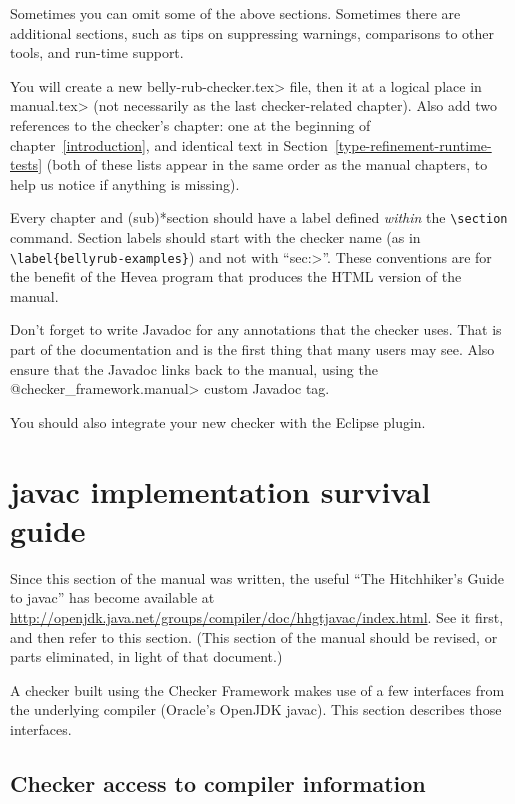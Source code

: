 Sometimes you can omit some of the above sections.  Sometimes there are
additional sections, such as tips on suppressing warnings, comparisons to
other tools, and run-time support.

You will create a new \<belly-rub-checker.tex> file,
then \verb|| it at a logical place in \<manual.tex> (not
necessarily as the last checker-related chapter).  Also add two references
to the checker's chapter:  one at the beginning of
chapter~\ref{introduction}, and identical text in
Section~\ref{type-refinement-runtime-tests} (both of these lists appear in
the same order as the manual chapters, to help us notice if anything is
missing).

Every chapter and (sub)*section should have a label defined \emph{within} the 
\verb|\section| command.  Section labels should start with the checker
name (as in \verb|\label{bellyrub-examples}|) and not with ``\<sec:>''.
These conventions are for the benefit of the Hevea program that produces
the HTML version of the manual.

Don't forget to write Javadoc for any annotations that the checker uses.
That is part of the documentation and is the first thing that many users
may see.  Also ensure that the Javadoc links back to the manual, using the
\<@checker\_framework.manual> custom Javadoc tag.

You should also integrate your new checker with the Eclipse plugin.


\section{javac implementation survival guide\label{javac-tips}}

Since this section of the manual was written, the useful ``The Hitchhiker's
Guide to javac'' has become available at
\url{http://openjdk.java.net/groups/compiler/doc/hhgtjavac/index.html}.
See it first, and then refer to this section.  (This section of the manual
should be revised, or parts eliminated, in light of that document.)


A checker built using the Checker Framework makes use of a few interfaces
from the underlying compiler (Oracle's OpenJDK javac).
This section describes those interfaces.




\subsection{Checker access to compiler information\label{compiler-information}}

